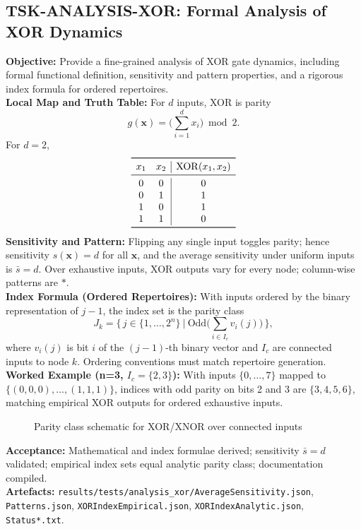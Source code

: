 \documentclass[11pt]{article}
\begin{document}
\subsection{TSK-ANALYSIS-XOR: Formal Analysis of XOR Dynamics}
\textbf{Objective:} Provide a fine-grained analysis of XOR gate dynamics, including formal functional definition, sensitivity and pattern properties, and a rigorous index formula for ordered repertoires.\\
\textbf{Local Map and Truth Table:} For \(d\) inputs, XOR is parity
\[
g(\mathbf{x}) = \big(\sum_{i=1}^{d} x_i\big)\bmod 2.
\]
For \(d=2\),
\[
\begin{array}{cc|c}
\toprule
 x_1 & x_2 & \mathrm{XOR}(x_1,x_2) \\
\midrule
 0 & 0 & 0 \\
 0 & 1 & 1 \\
 1 & 0 & 1 \\
 1 & 1 & 0 \\
\bottomrule
\end{array}
\]
\textbf{Sensitivity and Pattern:} Flipping any single input toggles parity; hence sensitivity \(s(\mathbf{x})=d\) for all \(\mathbf{x}\), and the average sensitivity under uniform inputs is \(\bar{s}=d\). Over exhaustive inputs, XOR outputs vary for every node; column-wise patterns are \(*\).\\
\textbf{Index Formula (Ordered Repertoires):} With inputs ordered by the binary representation of \(j-1\), the index set is the parity class
\[
J_k=\big\{\,j\in\{1,\dots,2^n\}\ \big|\ \mathrm{Odd}\big(\sum_{i\in I_c} v_i(j)\big)\,\big\},
\]
where \(v_i(j)\) is bit \(i\) of the \((j-1)\)-th binary vector and \(I_c\) are connected inputs to node \(k\). Ordering conventions must match repertoire generation.\\
\textbf{Worked Example (n=3, \(I_c=\{2,3\}\)):} With inputs \(\{0,\dots,7\}\) mapped to \(\{(0,0,0),\dots,(1,1,1)\}\), indices with odd parity on bits 2 and 3 are \(\{3,4,5,6\}\), matching empirical XOR outputs for ordered exhaustive inputs.\\
\begin{figure}[h]
\centering
{}
\caption{Parity class schematic for XOR/XNOR over connected inputs}
\end{figure}
\textbf{Acceptance:} Mathematical and index formulae derived; sensitivity \(\bar{s}=d\) validated; empirical index sets equal analytic parity class; documentation compiled.\\
\textbf{Artefacts:} \texttt{results/tests/analysis\_xor/AverageSensitivity.json}, \texttt{Patterns.json}, \texttt{XORIndexEmpirical.json}, \texttt{XORIndexAnalytic.json}, \texttt{Status*.txt}.
\end{document}
